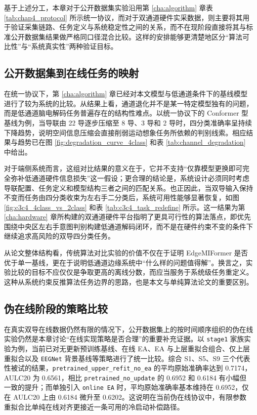 基于上述分工，本章对于公开数据集实验沿用第 \ref{cha:algorithm} 章表 \ref{tab:chap4_protocol} 所示统一协议，而对于双通道硬件实采数据，则主要将其用于验证采集链路、任务定义与系统稳定性之间的关系，而不在现阶段直接将其与标准公开数据集结果做严格同口径混合比较。这样的安排能够更清楚地区分“算法可比性”与“系统真实性”两种验证目标。

\subsection{公开数据集到在线任务的映射}

在统一协议下，第 \ref{cha:algorithm} 章已经对本文模型与低通道条件下的基线模型进行了较为系统的比较。从结果上看，通道退化并不是某一特定模型独有的问题，而是低通道脑电解码任务普遍存在的结构性难点。以统一协议下的 Conformer 型基线为例，当导联由 22 导逐步压缩至 8 导、3 导和 2 导时，四分类准确率呈持续下降趋势，说明空间信息压缩会直接削弱运动想象任务所依赖的判别线索。相应结果与趋势已在图 \ref{fig:degradation_curve_4class} 和表 \ref{tab:channel_degradation} 中给出。

对于端侧系统而言，这组对比结果的意义在于，它并不支持“仅靠模型更换即可完全弥补低通道硬件信息损失”这一假设；更合理的结论是，系统设计必须同时考虑导联配置、任务定义和模型结构三者之间的匹配关系。也正因此，当双导输入保持不变而任务由四分类收束为左右手二分类后，系统可用性能够显著恢复，如图 \ref{fig:c3c4_4class_vs_2class} 和表 \ref{tab:c3c4_task_redefine} 所示。这一结果为第 \ref{cha:hardware} 章所构建的双通道硬件平台指明了更具可行性的算法落点，即优先围绕中央区左右手意图判别构建低通道解码闭环，而不是在硬件约束不变的条件下继续追求高风险的双导四分类任务。

从论文整体结构看，传统算法对比实验的价值不仅在于证明 EdgeMIFormer 是否优于单一基线，更在于说明低通道边缘系统中“什么样的问题值得解”。换言之，实验比较的目标不应仅仅是争取更高的离线分数，而应当服务于系统级任务重定义。这种从系统约束反推算法任务边界的思路，也是本文与单纯算法论文的重要区别。

\subsection{伪在线阶段的策略比较}

在真实双导在线数据仍然有限的情况下，公开数据集上的按时间顺序组织的伪在线实验仍然是本章讨论“在线实现策略是否合理”的重要补充证据。以 \texttt{stage1} 家族实验为例，当前已对无更新预训练基线、在线 EA、EA 与上层重拟合组合、仅上层重拟合以及 \texttt{EEGNet} 背景基线等策略进行了统一比较。综合 S1、S5、S9 三个代表性被试的结果，\texttt{pretrained\_upper\_refit\_no\_ea} 的平均原始准确率达到 0.7174，AULC20 为 0.6561，相比 \texttt{pretrained\_no\_update} 的 0.6952 和 0.6184 有小幅但一致的提升；而单独引入 \texttt{online EA} 时，平均原始准确率基本维持在 0.6952，仅在 AULC20 上由 0.6184 微升至 0.6202。这说明在当前伪在线协议中，有限参数重拟合比单纯在线对齐更接近一条可用的冷启动补偿路径。

